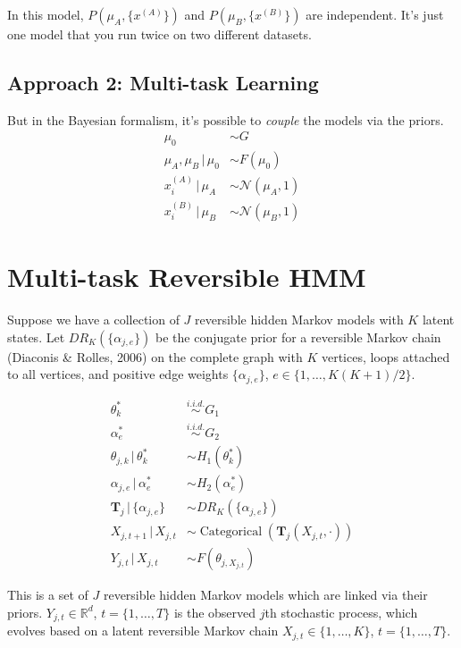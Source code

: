 \documentclass[twocolumn,floatfix,nofootinbib,aps]{revtex4-1}
\begin{document}
In this model, $P(\mu_A, \{x^{(A)}\})$ and $P(\mu_B, \{x^{(B)}\})$ are independent. It's just one model that you run twice on two different datasets.

\subsection{Approach 2: Multi-task Learning}

But in the Bayesian formalism, it's possible to \emph{couple} the models via the priors.
\begin{align*}
\mu_0 & \sim G \\
\mu_A, \mu_B \,|\, \mu_0 & \sim F(\mu_0) \\
x^{(A)}_i \,|\, \mu_A & \sim \mathcal{N}(\mu_A, 1) \\
x^{(B)}_i \,|\, \mu_B & \sim \mathcal{N}(\mu_B, 1)
\end{align*}


\section{Multi-task Reversible HMM}

Suppose we have a collection of $J$ reversible hidden Markov models with $K$ latent states. Let $DR_K(\{\alpha_{j, e}\})$ be the conjugate prior for a reversible Markov chain (Diaconis \& Rolles, 2006) on the complete graph with $K$ vertices, loops attached to all vertices, and positive edge weights $\{\alpha_{j, e}\}$, $e \in \{1, \ldots, K(K+1)/2\}$.

\begin{align*}
\theta^*_k & \overset{i.i.d.}{\sim} G_1 \\
\alpha^*_e & \overset{i.i.d.}{\sim} G_2 \\
\theta_{j,k} \,|\, \theta^*_k & \sim  H_1(\theta^*_k) \\
\alpha_{j,e} \,|\, \alpha^*_e & \sim H_2(\alpha^*_e) \\
\mathbf{T}_j \,|\, \{\alpha_{j, e}\} & \sim DR_K(\{\alpha_{j, e}\}) \\
X_{j, t+1} \,|\, X_{j, t} & \sim \operatorname{Categorical}(\mathbf{T}_{j}(X_{j,t}, \cdot)) \\
Y_{j,t} \,|\, X_{j,t} & \sim F(\theta_{j, X_{j,t}})
\end{align*}

This is a set of $J$ reversible hidden Markov models which are linked via their priors. $Y_{j,t} \in \mathbb{R}^d$, $t = \{1, \ldots, T\}$ is the observed $j$th stochastic process, which evolves based on a latent reversible Markov chain $X_{j, t} \in \{1, \ldots, K\}$, $t = \{1, \ldots, T\}$.
\end{document}
